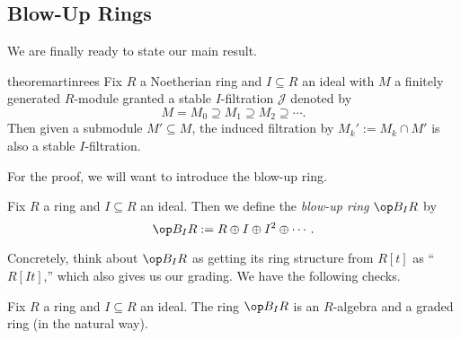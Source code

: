\subsection{Blow-Up Rings}
We are finally ready to state our main result.
\begin{restatable}{theorem}{artinrees} \label{thm:artinrees}
	Fix $R$ a Noetherian ring and $I\subseteq R$ an ideal with $M$ a finitely generated $R$-module granted a stable $I$-filtration $\mathcal J$ denoted by
	\[M=M_0\supseteq M_1\supseteq M_2\supseteq\cdots.\]
	Then given a submodule $M'\subseteq M$, the induced filtration by $M_k':=M_k\cap M'$ is also a stable $I$-filtration.
\end{restatable}
\noindent For the proof, we will want to introduce the blow-up ring.
\begin{definition}
	Fix $R$ a ring and $I\subseteq R$ an ideal. Then we define the \textit{blow-up ring} $\op B_IR$ by
	\[\op B_IR:=R\oplus I\oplus I^2\oplus\cdots.\]
\end{definition}
Concretely, think about $\op B_IR$ as getting its ring structure from $R[t]$ as ``$R[It]$,'' which also gives us our grading. We have the following checks.
\begin{lem}
	Fix $R$ a ring and $I\subseteq R$ an ideal. The ring $\op B_IR$ is an $R$-algebra and a graded ring (in the natural way).
\end{lem}
